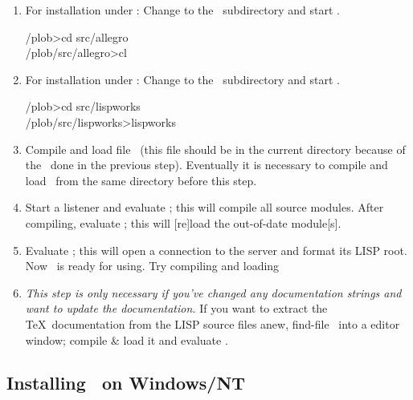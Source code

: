 \begin{enumerate}
\item\label{itm:lisp}For installation under \allegrocl: Change to the
  \ subdirectory and start
  \allegro.\\[\smallskipamount]
\begin{tt}\CodeSize
\td/plob>cd src/allegro\\
\td/plob/src/allegro>cl
\end{tt}

\item For installation under \lwcl: Change to the
  \ subdirectory and start
  \lw.\\[\smallskipamount]
\begin{tt}\CodeSize
\td/plob>cd src/lispworks\\
\td/plob/src/lispworks>lispworks
\end{tt}

\item\label{itm:compile} Compile and load file
  \ (this file should be in the current
  directory because of the \ done in the previous step).
  Eventually it is necessary to compile and load
  \ from the same directory before this step.

\item Start a listener and evaluate ; this
  will compile all source modules.  After compiling, evaluate
  ; this will [re]load the out-of-date module[s].

\item Evaluate ; this will open a connection
  to the server and format its LISP root. Now \plob\ is ready for
  using.  Try compiling and loading 

\item\label{itm:last} \emph{This step is only necessary if you've
    changed any documentation strings and want to update the
    documentation.} If you want to extract the \TeX\ documentation
  from the LISP source files anew, find-file
  \ into a
  editor window; compile \& load it and evaluate
  .

\end{enumerate}

\subsection[Installing PLOB on NT]%
{Installing \protect\plob\ on Windows/NT}%
\label{sec:installnt}

